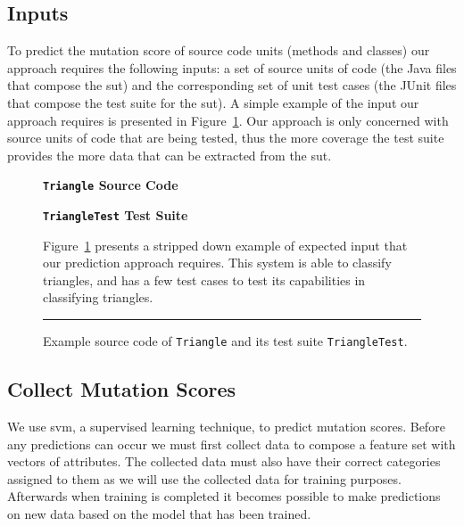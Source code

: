 \subsection{Inputs}
\label{subsec:approach_inputs}
To predict the mutation score of source code units (methods and classes) our approach requires the following inputs: a set of source units of code (the Java files that compose the \gls{sut}) and the corresponding set of unit test cases (the JUnit files that compose the test suite for the \gls{sut}). A simple example of the input our approach requires is presented in Figure~\ref{fig:triangle_example}. Our approach is only concerned with source units of code that are being tested, thus the more coverage the test suite provides the more data that can be extracted from the \gls{sut}.

\begin{figure}[h]
  \centering
  \begin{minipage}{7.25cm}
  \centering
  \footnotesize{\textbf{\texttt{Triangle} Source Code}}
  
  \end{minipage}
  \hfill
  \begin{minipage}{7.25cm}
  \centering
  \footnotesize{\textbf{\texttt{TriangleTest} Test Suite}}
  
  \end{minipage}
  \caption{Example source code of \texttt{Triangle} and its test suite \texttt{TriangleTest}.}
  \vspace{1mm}
  \footnotesize{Figure~\ref{fig:triangle_example} presents a stripped down example of expected input that our prediction approach requires. This system is able to classify triangles, and has a few test cases to test its capabilities in classifying triangles.}
  \vspace{2mm}
  \hrule
  \label{fig:triangle_example}
\end{figure}


\subsection{Collect Mutation Scores}
\label{subsec:approach_collect_mutation_scores}
We use \gls{svm}, a supervised learning technique, to predict mutation scores. Before any predictions can occur we must first collect data to compose a feature set with vectors of attributes. The collected data must also have their correct categories assigned to them as we will use the collected data for training purposes. Afterwards when training is completed it becomes possible to make predictions on new data based on the model that has been trained.

